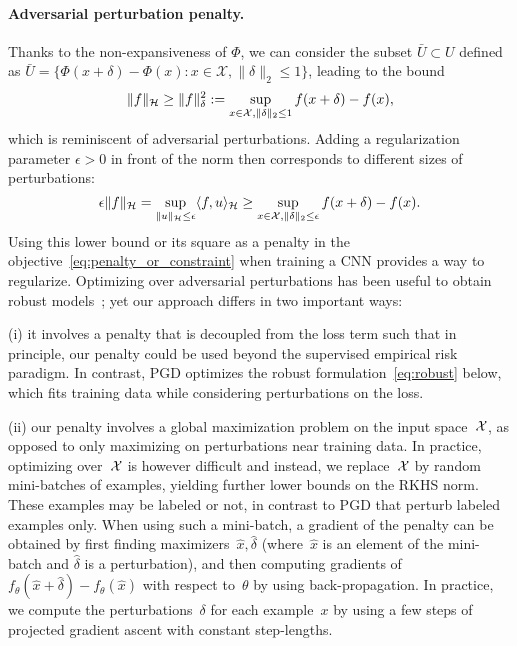 \paragraph{Adversarial perturbation penalty.}
Thanks to the non-expansiveness of $\Phi$, we can consider the subset $\bar U \subset U$ defined as $\bar{U} = \{\Phi(x + \delta) - \Phi(x) : x \in \mathcal X, \|\delta\|_2 \leq 1 \}$,
leading to the bound
\begin{equation}
\label{eq:lower_bound}
\|f\|_{\mathcal H}  \geq  \|f\|_\delta^2 := \sup_{x \in \mathcal X, \|\delta\|_2 \leq 1} f(x + \delta) - f(x),
\end{equation}
which is reminiscent of adversarial perturbations. Adding a regularization parameter $\epsilon > 0$ in front of the norm
then corresponds to different sizes of perturbations:
\begin{equation}
\label{eq:kernel_adv}
\epsilon \|f\|_{\mathcal H} = \sup_{\|u\|_{\mathcal H} \leq \epsilon} \langle f, u \rangle_{\mathcal H} \geq \sup_{x \in \mathcal X, \|\delta\|_2 \leq \epsilon} f(x + \delta) - f(x).
\end{equation}
Using this lower bound or its square as a penalty in the objective~\eqref{eq:penalty_or_constraint}
when training a CNN provides a way to regularize.
Optimizing over adversarial perturbations has been useful to obtain robust models~\citep[\eg, the PGD method of~][]{madry2018towards};
yet our approach differs in two important ways: 

(i) it involves a penalty that is decoupled from the loss term such that 
in principle, our penalty could be used beyond the supervised empirical risk paradigm.
In contrast, PGD optimizes the robust formulation~\eqref{eq:robust} below, which 
fits training data while considering
perturbations on the loss.

(ii) our penalty involves a global maximization problem
on the input space~${\mathcal X}$, as opposed to only maximizing on perturbations near
training data. In practice, optimizing over~${\mathcal X}$ is however
difficult and instead, we replace~${\mathcal X}$ by random mini-batches of examples,
yielding further lower bounds on the RKHS norm. These examples may be labeled or not,
in contrast to PGD that perturb labeled examples only.
When using such a mini-batch,
a gradient of the penalty can be obtained by first finding maximizers~$\hat x, \hat \delta$
(where~$\hat x$ is an element of the mini-batch and $\hat{\delta}$ is a perturbation), and then computing gradients
of $f_\theta(\hat x + \hat \delta) - f_\theta(\hat x)$ with respect to~$\theta$ by using back-propagation.
In practice, we compute the perturbations~$\delta$ for each example~$x$ by using a few steps of
projected gradient ascent with constant step-lengths.

